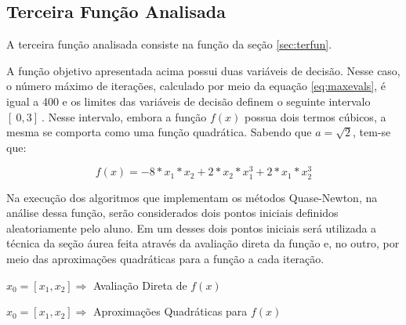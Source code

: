 


\subsection{Terceira Função Analisada}

A terceira função analisada consiste na função da seção \ref{sec:terfun}.

A função objetivo apresentada acima possui duas variáveis de decisão. Nesse caso, o número máximo de iterações, calculado por meio da equação \ref{eq:maxevals}, é igual a 400 e os limites das variáveis de decisão definem o seguinte intervalo $[\ 0 , 3 ]\ $. Nesse intervalo, embora a função $f(x)$ possua dois termos cúbicos, a mesma se comporta como uma função quadrática. Sabendo que $a=\sqrt{2}$, tem-se que:

\begin{equation*} 
    f(x) = -8*x_1*x_2+2*x_2*x_1^3+2*x_1*x_2^3
\end{equation*}

Na execução dos algoritmos que implementam os métodos Quase-Newton, na análise dessa função, serão considerados dois pontos iniciais definidos aleatoriamente pelo aluno. Em um desses dois pontos iniciais será utilizada a técnica da seção áurea feita através da avaliação direta da função e, no outro, por meio das aproximações quadráticas para a função a cada iteração.

\begin{minipage}{\linewidth}
    \centering
    $x_0=[x_1,x_2]\Longrightarrow$  Avaliação Direta de $f(x)$
    \label{tab:tblg} 
    \writetable{\tblg}
    \bigskip
\end{minipage}

\begin{minipage}{\linewidth}
    \centering
    $x_0=[x_1,x_2]\Longrightarrow$  Aproximações Quadráticas para $f(x)$
    \label{tab:tblh} 
    \writetable{\tblh}
    \bigskip
\end{minipage}

